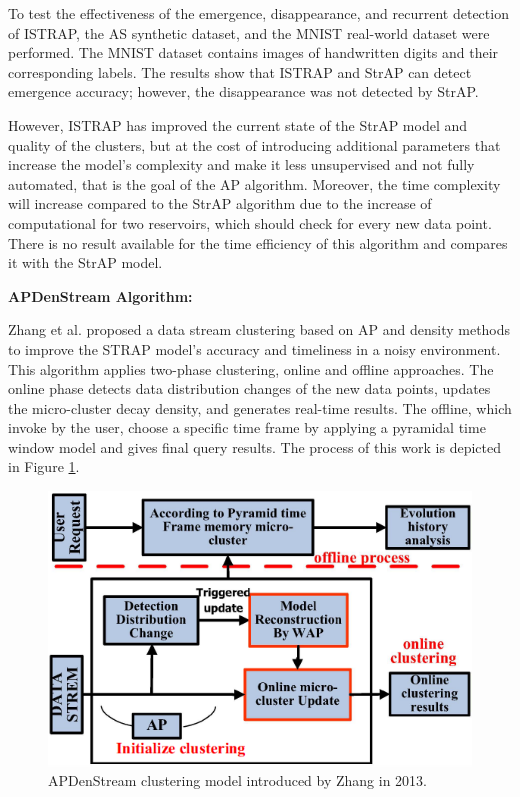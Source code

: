 
To test the effectiveness of the emergence, disappearance, and recurrent detection of ISTRAP, the AS synthetic dataset, and the MNIST real-world dataset were performed.
The MNIST dataset contains images of handwritten digits and their corresponding labels.
The results show that ISTRAP and StrAP can detect emergence accuracy; however, the disappearance was not detected by StrAP.

However, ISTRAP has improved the current state of the StrAP model and quality of the clusters, but at the cost of introducing additional parameters that increase the model's complexity and make it less unsupervised and not fully automated, that is the goal of the AP algorithm.
Moreover, the time complexity will increase compared to the StrAP algorithm due to the increase of computational for two reservoirs, which should check for every new data point. There is no result available for the time efficiency of this algorithm and compares it with the StrAP model.





\textbf{APDenStream Algorithm:}

Zhang et al. \cite{zhang2013online} proposed a data stream clustering based on AP and density methods to improve the STRAP model's accuracy and timeliness in a noisy environment. This algorithm applies two-phase clustering, online and offline approaches. The online phase detects data distribution changes of the new data points, updates the micro-cluster decay density, and generates real-time results. The offline, which invoke by the user, choose a specific time frame by applying a pyramidal time window model and gives final query results. The process of this work is depicted in Figure \ref{APden}. 


\begin{figure}[h]
\centering
\includegraphics[width = 10 cm]{image/Chapters/Chapter3/APDenstream.PNG}
\caption{APDenStream clustering model introduced by Zhang in 2013. }
\label{APden}
\end{figure}


